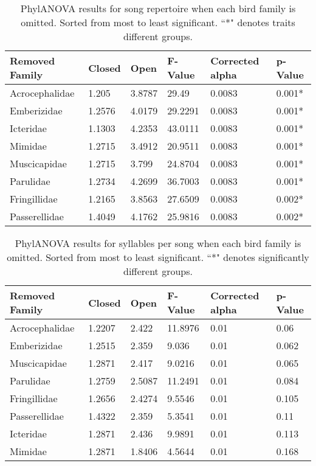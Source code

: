 \documentclass[a4paper,12pt]{article}
\begin{document}
\begin{table}[ht]
\caption{PhylANOVA results for song repertoire when each bird family is omitted.  Sorted from most to least significant.  ``*" denotes traits different groups.}
\centering
\begin{tabular}{llllll}
  \hline
Removed Family & Closed & Open & F-Value & Corrected alpha & p-Value \\ 
  \hline
Acrocephalidae & 1.205 & 3.8787 & 29.49 & 0.0083 & 0.001* \\ 
  Emberizidae & 1.2576 & 4.0179 & 29.2291 & 0.0083 & 0.001* \\ 
  Icteridae & 1.1303 & 4.2353 & 43.0111 & 0.0083 & 0.001* \\ 
  Mimidae & 1.2715 & 3.4912 & 20.9511 & 0.0083 & 0.001* \\ 
  Muscicapidae & 1.2715 & 3.799 & 24.8704 & 0.0083 & 0.001* \\ 
  Parulidae & 1.2734 & 4.2699 & 36.7003 & 0.0083 & 0.001* \\ 
  Fringillidae & 1.2165 & 3.8563 & 27.6509 & 0.0083 & 0.002* \\ 
  Passerellidae & 1.4049 & 4.1762 & 25.9816 & 0.0083 & 0.002* \\ 
   \hline
\end{tabular}
\end{table}

\begin{table}[ht]
\caption{PhylANOVA results for syllables per song when each bird family is omitted.  Sorted from most to least significant.  ``*" denotes significantly different groups.}
\centering
\begin{tabular}{llllll}
  \hline
Removed Family & Closed & Open & F-Value & Corrected alpha & p-Value \\ 
  \hline
Acrocephalidae & 1.2207 & 2.422 & 11.8976 & 0.01 & 0.06 \\ 
  Emberizidae & 1.2515 & 2.359 & 9.036 & 0.01 & 0.062 \\ 
  Muscicapidae & 1.2871 & 2.417 & 9.0216 & 0.01 & 0.065 \\ 
  Parulidae & 1.2759 & 2.5087 & 11.2491 & 0.01 & 0.084 \\ 
  Fringillidae & 1.2656 & 2.4274 & 9.5546 & 0.01 & 0.105 \\ 
  Passerellidae & 1.4322 & 2.359 & 5.3541 & 0.01 & 0.11 \\ 
  Icteridae & 1.2871 & 2.436 & 9.9891 & 0.01 & 0.113 \\ 
  Mimidae & 1.2871 & 1.8406 & 4.5644 & 0.01 & 0.168 \\ 
   \hline
\end{tabular}
\end{table}
\end{document}
